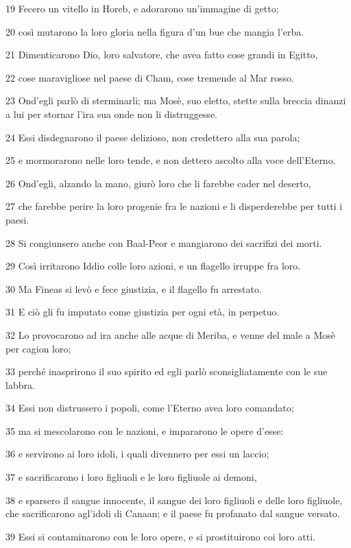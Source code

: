 \par 19 Fecero un vitello in Horeb, e adorarono un'immagine di getto;
\par 20 così mutarono la loro gloria nella figura d'un bue che mangia l'erba.
\par 21 Dimenticarono Dio, loro salvatore, che avea fatto cose grandi in Egitto,
\par 22 cose maravigliose nel paese di Cham, cose tremende al Mar rosso.
\par 23 Ond'egli parlò di sterminarli; ma Mosè, suo eletto, stette sulla breccia dinanzi a lui per stornar l'ira sua onde non li distruggesse.
\par 24 Essi disdegnarono il paese delizioso, non credettero alla sua parola;
\par 25 e mormorarono nelle loro tende, e non dettero ascolto alla voce dell'Eterno.
\par 26 Ond'egli, alzando la mano, giurò loro che li farebbe cader nel deserto,
\par 27 che farebbe perire la loro progenie fra le nazioni e li disperderebbe per tutti i paesi.
\par 28 Si congiunsero anche con Baal-Peor e mangiarono dei sacrifizi dei morti.
\par 29 Così irritarono Iddio colle loro azioni, e un flagello irruppe fra loro.
\par 30 Ma Fineas si levò e fece giustizia, e il flagello fu arrestato.
\par 31 E ciò gli fu imputato come giustizia per ogni età, in perpetuo.
\par 32 Lo provocarono ad ira anche alle acque di Meriba, e venne del male a Mosè per cagion loro;
\par 33 perché inasprirono il suo spirito ed egli parlò sconsigliatamente con le sue labbra.
\par 34 Essi non distrussero i popoli, come l'Eterno avea loro comandato;
\par 35 ma si mescolarono con le nazioni, e impararono le opere d'esse:
\par 36 e servirono ai loro idoli, i quali divennero per essi un laccio;
\par 37 e sacrificarono i loro figliuoli e le loro figliuole ai demoni,
\par 38 e sparsero il sangue innocente, il sangue dei loro figliuoli e delle loro figliuole, che sacrificarono agl'idoli di Canaan; e il paese fu profanato dal sangue versato.
\par 39 Essi si contaminarono con le loro opere, e si prostituirono coi loro atti.
